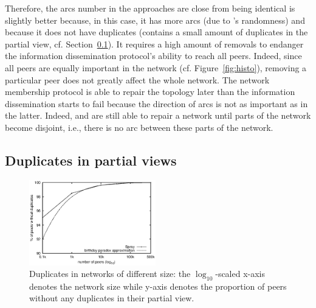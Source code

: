 \begin{asparadesc}
  Therefore, the arcs number in the approaches are close from being identical
  \CYCLON is slightly better because, in this case, it has more arcs (due to
  \SPRAY's randomness) and because it does not have duplicates (\SPRAY contains
  a small amount of duplicates in the partial view,
  cf. Section~\ref{subsec:duplicates}). It requires a high amount of removals
  to endanger the information dissemination protocol's ability to reach all
  peers. Indeed, since all peers are equally important in the network
  (cf. Figure~\ref{fig:histo}), removing a particular peer does not greatly
  affect the whole network. The network membership protocol is able to repair
  the topology later than the information dissemination starts to fail because
  the direction of arcs is not as important as in the latter. Indeed, \CYCLON
  and \SPRAY are still able to repair a network until parts of the network
  become disjoint, i.e., there is no arc between these parts of the network.
\end{asparadesc}

\subsection{Duplicates in partial views}
\label{subsec:duplicates}

\begin{figure}
  \centering
  \includegraphics[width=0.49\textwidth]{img/duplicates.eps}
  \caption{\label{fig:duplicates}Duplicates in networks of different size: the
    $\log_{10}$-scaled x-axis denotes the network size while y-axis denotes the
    proportion of peers without any duplicates in their partial view.}
\end{figure}

